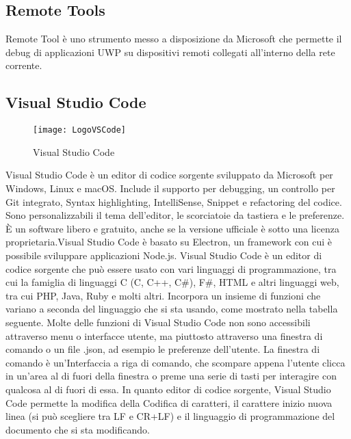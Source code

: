 \subsection{Remote Tools}
Remote Tool\cite{rd} è uno strumento messo a disposizione da Microsoft che permette il debug di applicazioni UWP su dispositivi remoti collegati all'interno della rete corrente.
\subsection{Visual Studio Code}
\begin{figure}[htpb!]
\center
  \texttt{[image: LogoVSCode]}
  \caption{Visual Studio Code}
\end{figure}
Visual Studio Code\cite{vsc} è un editor di codice sorgente sviluppato da Microsoft per Windows, Linux e macOS. Include il supporto per debugging, un controllo per Git integrato, Syntax highlighting, IntelliSense, Snippet e refactoring del codice. Sono personalizzabili il tema dell'editor, le scorciatoie da tastiera e le preferenze. È un software libero e gratuito, anche se la versione ufficiale è sotto una licenza proprietaria.Visual Studio Code è basato su Electron, un framework con cui è possibile sviluppare applicazioni Node.js.
Visual Studio Code è un editor di codice sorgente che può essere usato con vari linguaggi di programmazione, tra cui la famiglia di linguaggi C (C, C++, C\#), F\#, HTML e altri linguaggi web, tra cui PHP, Java, Ruby e molti altri. Incorpora un insieme di funzioni che variano a seconda del linguaggio che si sta usando, come mostrato nella tabella seguente. Molte delle funzioni di Visual Studio Code non sono accessibili attraverso menu o interfacce utente, ma piuttosto attraverso una finestra di comando o un file .json, ad esempio le preferenze dell'utente. La finestra di comando è un'Interfaccia a riga di comando, che scompare appena l'utente clicca in un'area al di fuori della finestra o preme una serie di tasti per interagire con qualcosa al di fuori di essa.
In quanto editor di codice sorgente, Visual Studio Code permette la modifica della Codifica di caratteri, il carattere inizio nuova linea (si può scegliere tra LF e CR+LF) e il linguaggio di programmazione del documento che si sta modificando.
